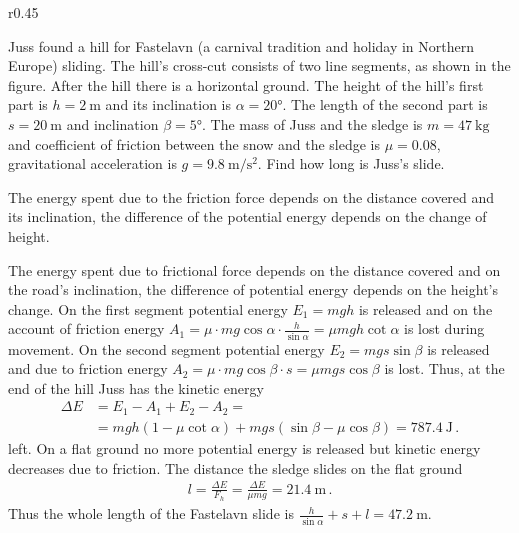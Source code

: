 {\ifEngStatement
\begin{wrapfigure}[5]{r}{0.45\linewidth}
	\vspace{-5pt}
\end{wrapfigure}
Juss found a hill for Fastelavn (a carnival tradition and holiday in Northern Europe) sliding. The hill’s cross-cut consists of two line segments, as shown in the figure. After the hill there is a horizontal ground. The height of the hill’s first part is \(h=\SI{2}{\meter}\) and its inclination is \(\alpha=\ang{20}\). The length of the second part is \(s=\SI{20}{\meter}\) and inclination \(\beta=\ang{5}\). The mass of Juss and the sledge is \(m=\SI{47}{\kilogram}\) and coefficient of friction between the snow and the sledge is \(\mu=\num{0.08}\), gravitational acceleration is \(g=\SI{9.8}{\meter\per\second\squared}\). Find how long is Juss’s slide.
\fi


\ifEngHint
The energy spent due to the friction force depends on the distance covered and its inclination, the difference of the potential energy depends on the change of height.
\fi


\ifEngSolution
The energy spent due to frictional force depends on the distance covered and on the road’s inclination, the difference of potential energy depends on the height’s change. On the first segment potential energy \(E_1 = mgh\) is released and on the account of friction energy \( A_1 = \mu \cdot mg\cos\alpha \cdot \frac{h}{\sin\alpha} = \mu mgh \cot\alpha \) is lost during movement. On the second segment potential energy \(E_2 = mgs \sin\beta\) is released and due to friction energy \( A_2 = \mu \cdot mg \cos \beta \cdot s = \mu mgs \cos \beta \) is lost. Thus, at the end of the hill Juss has the kinetic energy
\begin{align*}
\Delta E &= E_1 - A_1 + E_2 - A_2 = \\
&= mgh(1-\mu\cot\alpha) + mgs(\sin\beta - \mu\cos\beta) =  \SI{787.4}{\joule} \, .
\end{align*} 
left. On a flat ground no more potential energy is released but kinetic energy decreases due to friction. The distance the sledge slides on the flat ground
\begin{align*}
l = \frac{\Delta E}{F_h} = \frac{\Delta E}{\mu mg} = \SI{21.4}{\meter} \, .
\end{align*} 
Thus the whole length of the Fastelavn slide is \(\frac{h}{\sin\alpha} + s + l = \SI{47.2}{\meter}\).
\fi
}